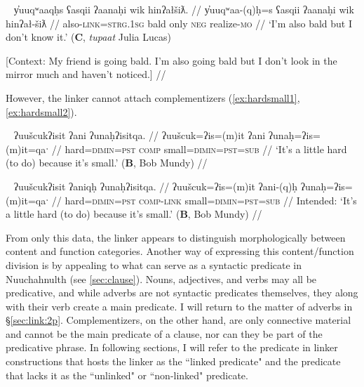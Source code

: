 \ex~ \label{ex:alsobald}
\begingl
\glpreamble y̓uuqʷaaqḥs ʕasqii ʔaanaḥi wik hinʔałšiƛ. //
\gla y̓uuqʷaa-(q)ḥ=s ʕasqii ʔaanaḥi wik hinʔał-šiƛ //
\glb also-\textsc{link}=\textsc{strg.1sg} bald only \textsc{neg} realize-\textsc{mo} //
\glft `I'm also bald but I don't know it.' (\textbf{C}, \textit{tupaat} Julia Lucas) 

[Context: My friend is going bald. I'm also going bald but I don't look in the mirror much and haven't noticed.\footnotemark] //
\endgl
\xe


However, the linker cannot attach complementizers (\ref{ex:hardsmall1}, \ref{ex:hardsmall2}).

\ex~ \label{ex:hardsmall1}
\begingl
\glpreamble ʔuušcukʔisit ʔani ʔunaḥʔisitqa. //
\gla ʔuušcuk=ʔis=(m)it ʔani ʔunaḥ=ʔis=(m)it=qaˑ //
\glb hard=\textsc{dimin}=\textsc{pst} \textsc{comp} small=\textsc{dimin}=\textsc{pst}=\textsc{sub} //
\glft `It's a little hard (to do) because it's small.' (\textbf{B}, Bob Mundy) //
\endgl
\xe

\ex~ \label{ex:hardsmall2}
\begingl
\glpreamble *ʔuušcukʔisit ʔaniqḥ ʔunaḥʔisitqa. //
\gla ʔuušcuk=ʔis=(m)it ʔani-(q)ḥ ʔunaḥ=ʔis=(m)it=qaˑ //
\glb hard=\textsc{dimin}=\textsc{pst} \textsc{comp}-\textsc{link} small=\textsc{dimin}=\textsc{pst}=\textsc{sub} //
\glft Intended: `It's a little hard (to do) because it's small.' (\textbf{B}, Bob Mundy) //
\endgl
\xe

From only this data, the linker appears to distinguish morphologically between content and function categories. Another way of expressing this content/function division is by appealing to what can serve as a syntactic predicate in Nuuchahnulth (see \ref{sec:clause}). Nouns, adjectives, and verbs may all be predicative, and while adverbs are not syntactic predicates themselves, they along with their verb create a main predicate. I will return to the matter of adverbs in \S\ref{sec:link:2p}. Complementizers, on the other hand, are only connective material and cannot be the main predicate of a clause, nor can they be part of the predicative phrase. In following sections, I will refer to the predicate in linker constructions that hosts the linker as the ``linked predicate" and the predicate that lacks it as the ``unlinked" or ``non-linked" predicate.


